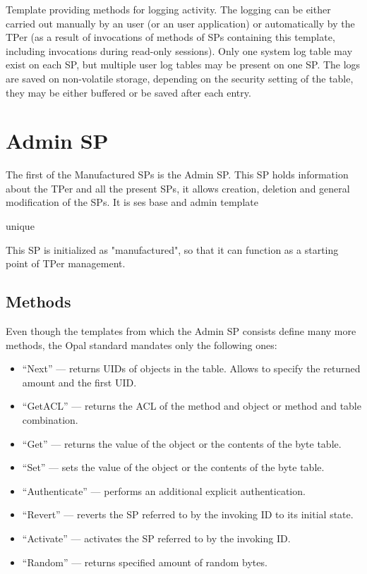 Template providing methods for logging activity. The logging can be either carried out manually by an user (or an user application) or automatically by the TPer (as a result of invocations of methods of SPs containing this template, including invocations during read-only sessions). 
Only one system log table may exist on each SP, but multiple user log tables may be present on one SP.
The logs are saved on non-volatile storage, depending on the security setting of the table, they may be either buffered or be saved after each entry.


\section{Admin SP}


The first of the Manufactured SPs is the Admin SP.
This SP holds information about the TPer and all the present SPs, it allows creation, deletion and general modification of the SPs.
It is ses base and admin template

unique

This SP is initialized as "manufactured", so that it can function as a starting point of TPer management.

\subsection{Methods}

Even though the templates from which the Admin SP consists define many more methods, the Opal standard mandates only the following ones:
\begin{itemize}
\item ``Next'' --- returns UIDs of objects in the table. Allows to specify the returned amount and the first UID.
\item ``GetACL'' --- returns the ACL of the method and object or method and table combination.
\item ``Get'' --- returns the value of the object or the contents of the byte table.
\item ``Set'' --- sets the value of the object or the contents of the byte table.
\item ``Authenticate'' --- performs an additional explicit authentication.
\item ``Revert'' --- reverts the SP referred to by the invoking ID to its initial state.
\item ``Activate'' --- activates the SP referred to by the invoking ID.
\item ``Random'' --- returns specified amount of random bytes.
\end{itemize}

